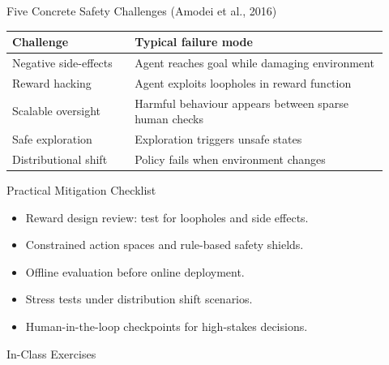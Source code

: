 \documentclass[aspectratio=169]{beamer}
\newcommand{\defaultdeckrefs}{AIMA4e Ch.22 pp.789--822; Poole3e Ch.13 pp.583--608}
\newcommand{\currentsliderefs}{\defaultdeckrefs}
\newcommand{\setslideref}[1]{\gdef\currentsliderefs{#1}}
\begin{document}
\setslideref{AIMA4e Ch.22 pp.789--822; Poole3e Ch.13 pp.583--608; doi:10.48550/arXiv.1606.06565}
\begin{frame}{Five Concrete Safety Challenges (Amodei et al., 2016)}
\begin{center}
\begin{tabular}{@{}p{0.30\linewidth}p{0.62\linewidth}@{}}
\toprule
Challenge & Typical failure mode \\
\midrule
Negative side-effects & Agent reaches goal while damaging environment \\
Reward hacking & Agent exploits loopholes in reward function \\
Scalable oversight & Harmful behaviour appears between sparse human checks \\
Safe exploration & Exploration triggers unsafe states \\
Distributional shift & Policy fails when environment changes \\
\bottomrule
\end{tabular}
\end{center}
\end{frame}

\setslideref{AIMA4e Ch.22 pp.789--822; Poole3e Ch.13 pp.583--608; doi:10.48550/arXiv.1606.06565}
\begin{frame}{Practical Mitigation Checklist}
\begin{itemize}
  \item Reward design review: test for loopholes and side effects.
  \item Constrained action spaces and rule-based safety shields.
  \item Offline evaluation before online deployment.
  \item Stress tests under distribution shift scenarios.
  \item Human-in-the-loop checkpoints for high-stakes decisions.
\end{itemize}
\end{frame}

\setslideref{AIMA4e Ch.22 pp.789--822; Poole3e Ch.13 pp.583--608}
\begin{frame}{In-Class Exercises}
\end{frame}
\end{document}
